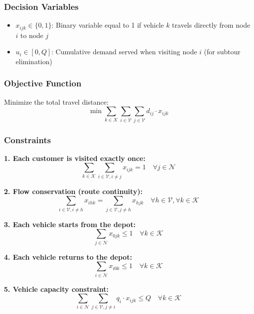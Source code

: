 \documentclass[a4paper,twoside]{article}
\begin{document}
\subsubsection{Decision Variables}
\begin{itemize}
    \item $x_{ijk} \in \{0, 1\}$: Binary variable equal to 1 if vehicle $k$ travels directly from node $i$ to node $j$
    \item $u_i \in [0, Q]$: Cumulative demand served when visiting node $i$ (for subtour elimination)
\end{itemize}

\subsubsection{Objective Function}
Minimize the total travel distance:
\begin{equation}
\min \sum_{k \in \mathcal{K}} \sum_{i \in \mathcal{V}} \sum_{j \in \mathcal{V}} d_{ij} \cdot x_{ijk}
\end{equation}

\subsubsection{Constraints}

\textbf{1. Each customer is visited exactly once:}
\begin{equation}
\sum_{k \in \mathcal{K}} \sum_{i \in \mathcal{V}, i \neq j} x_{ijk} = 1 \quad \forall j \in \mathcal{N}
\end{equation}

\textbf{2. Flow conservation (route continuity):}
\begin{equation}
\sum_{i \in \mathcal{V}, i \neq h} x_{ihk} = \sum_{j \in \mathcal{V}, j \neq h} x_{hjk} \quad \forall h \in \mathcal{V}, \forall k \in \mathcal{K}
\end{equation}

\textbf{3. Each vehicle starts from the depot:}
\begin{equation}
\sum_{j \in \mathcal{N}} x_{0jk} \leq 1 \quad \forall k \in \mathcal{K}
\end{equation}

\textbf{4. Each vehicle returns to the depot:}
\begin{equation}
\sum_{i \in \mathcal{N}} x_{i0k} \leq 1 \quad \forall k \in \mathcal{K}
\end{equation}

\textbf{5. Vehicle capacity constraint:}
\begin{equation}
\sum_{i \in \mathcal{N}} \sum_{j \in \mathcal{V}, j \neq i} q_i \cdot x_{ijk} \leq Q \quad \forall k \in \mathcal{K}
\end{equation}
\end{document}
